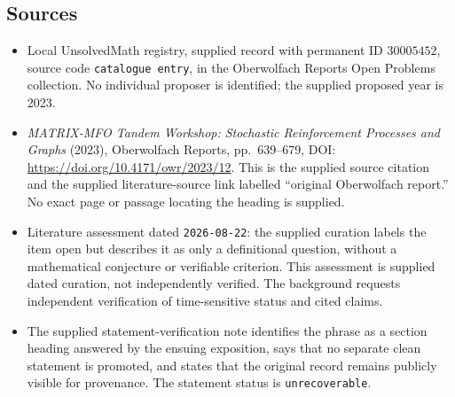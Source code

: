 \documentclass[11pt]{article}
\begin{document}
\subsection{Sources}
\begin{itemize}
\item Local UnsolvedMath registry, supplied record with permanent ID \(30005452\), source code \texttt{catalogue entry}, in the Oberwolfach Reports Open Problems collection. No individual proposer is identified; the supplied proposed year is 2023.
\item \emph{MATRIX-MFO Tandem Workshop: Stochastic Reinforcement Processes and Graphs} (2023), Oberwolfach Reports, pp.\ 639--679, DOI: \url{https://doi.org/10.4171/owr/2023/12}. This is the supplied source citation and the supplied literature-source link labelled ``original Oberwolfach report.'' No exact page or passage locating the heading is supplied.
\item Literature assessment dated \texttt{2026-08-22}: the supplied curation labels the item open but describes it as only a definitional question, without a mathematical conjecture or verifiable criterion. This assessment is supplied dated curation, not independently verified. The background requests independent verification of time-sensitive status and cited claims.
\item The supplied statement-verification note identifies the phrase as a section heading answered by the ensuing exposition, says that no separate clean statement is promoted, and states that the original record remains publicly visible for provenance. The statement status is \texttt{unrecoverable}.
\end{itemize}
\end{document}
